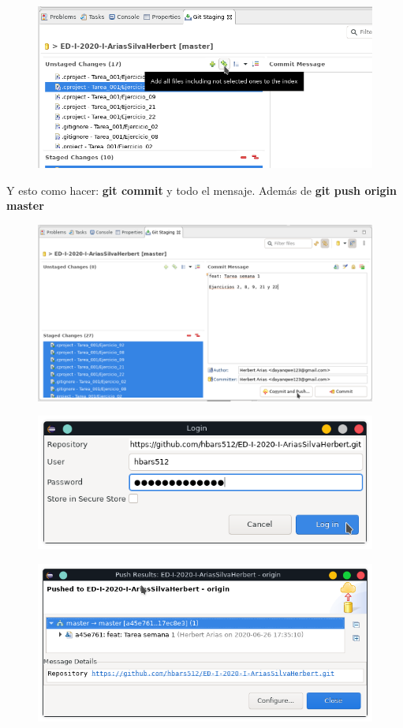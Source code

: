 \documentclass{article}
\begin{document}
\begin{figure}[h!]
  \centering
  \includegraphics[scale=0.75]{./Pictures/033_git_add_all.png}
\end{figure}

Y esto como hacer: \textbf{git commit} y todo el mensaje. Además de \textbf{git
push origin master}

\begin{figure}[h!]
  \centering
  \includegraphics[scale=0.65]{./Pictures/034_git_commit_and_push.png}
\end{figure}

\begin{figure}[h!]
  \centering
  \includegraphics[scale=0.75]{./Pictures/035_login_sent.png}
\end{figure}

\newpage

\begin{figure}[h!]
  \centering
  \includegraphics[scale=0.75]{./Pictures/036_push_results.png}
\end{figure}
\end{document}

